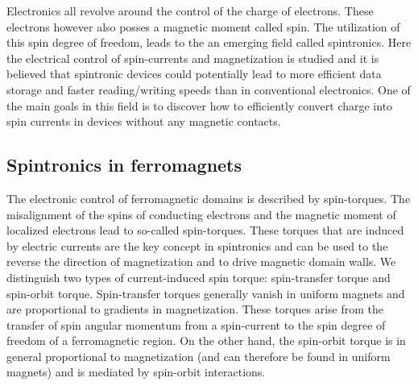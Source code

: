 Electronics all revolve around the control of the charge of electrons. These electrons however also posses a magnetic moment called spin. The utilization of this spin degree of freedom, leads to the an emerging field called spintronics. Here the electrical control of spin-currents and magnetization is studied and it is believed that spintronic devices could potentially lead to more efficient data storage and faster reading/writing speeds than in conventional electronics. One of the main goals in this field is to discover how to efficiently convert charge into spin currents in devices without any magnetic contacts. 




\subsection{Spintronics in ferromagnets}
The electronic control of ferromagnetic domains is described by spin-torques. The misalignment of the spins of conducting electrons and the magnetic moment of localized electrons lead to so-called spin-torques. These torques that are induced by electric currents are the key concept in spintronics and can be used to the reverse the direction of magnetization and to drive magnetic domain walls. We distinguish two types of current-induced spin torque: spin-transfer torque and spin-orbit torque. Spin-transfer torques generally vanish in uniform magnets and are proportional to gradients in magnetization. These torques arise from the transfer of spin angular momentum from a spin-current to the spin degree of freedom of a ferromagnetic region.  On the other hand, the spin-orbit torque is in general proportional to magnetization (and can therefore be found in uniform magnets) and is mediated by spin-orbit interactions. 

